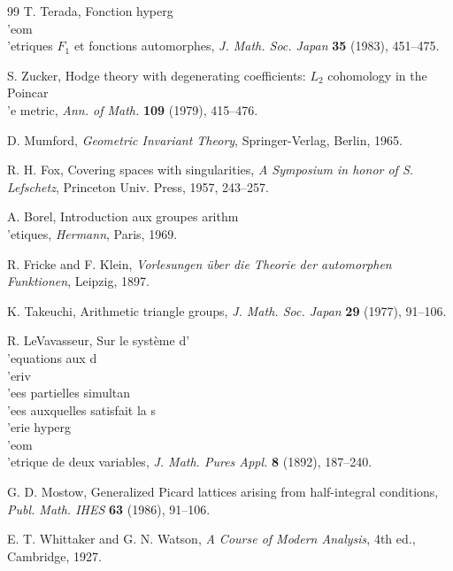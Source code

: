 \documentclass[12pt,a4paper]{article}
\theoremstyle{plain}
\theoremstyle{definition}
\theoremstyle{remark}
\numberwithin{equation}{section}
\begin{document}
\begin{thebibliography}{99}
T. Terada, Fonction hyperg\\'eom\\'etriques $F_1$ et fonctions automorphes, \textit{J. Math. Soc. Japan} \textbf{35} (1983), 451--475.

S. Zucker, Hodge theory with degenerating coefficients: $L_2$ cohomology in the Poincar\\'e metric, \textit{Ann. of Math.} \textbf{109} (1979), 415--476.

D. Mumford, \textit{Geometric Invariant Theory}, Springer-Verlag, Berlin, 1965.

R. H. Fox, Covering spaces with singularities, \textit{A Symposium in honor of S. Lefschetz}, Princeton Univ. Press, 1957, 243--257.

A. Borel, Introduction aux groupes arithm\\'etiques, \textit{Hermann}, Paris, 1969.

R. Fricke and F. Klein, \textit{Vorlesungen \"uber die Theorie der automorphen Funktionen}, Leipzig, 1897.

K. Takeuchi, Arithmetic triangle groups, \textit{J. Math. Soc. Japan} \textbf{29} (1977), 91--106.

R. LeVavasseur, Sur le syst\`eme d'\\'equations aux d\\'eriv\\'ees partielles simultan\\'ees auxquelles satisfait la s\\'erie hyperg\\'eom\\'etrique de deux variables, \textit{J. Math. Pures Appl.} \textbf{8} (1892), 187--240.

G. D. Mostow, Generalized Picard lattices arising from half-integral conditions, \textit{Publ. Math. IHES} \textbf{63} (1986), 91--106.

E. T. Whittaker and G. N. Watson, \textit{A Course of Modern Analysis}, 4th ed., Cambridge, 1927.

\end{thebibliography}
\end{document}
